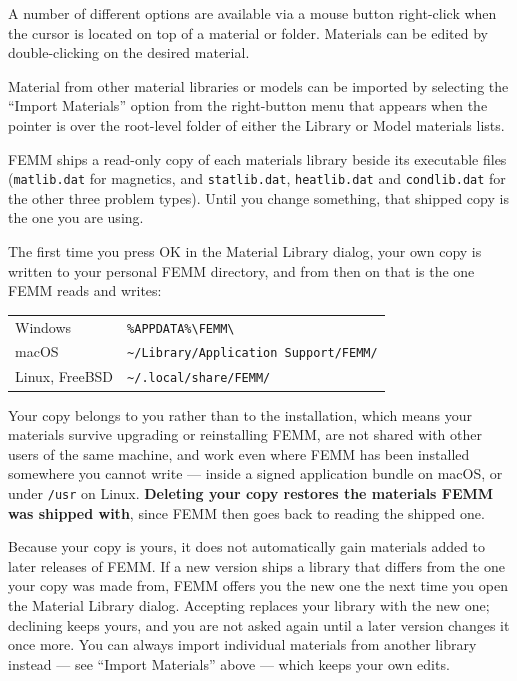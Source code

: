 \documentclass[12pt]{report}
\begin{document}
A number of different options are available via a mouse button right-click
when the cursor is located on top of a material or folder. Materials can be edited
by double-clicking on the desired material.

Material from other material libraries or models can be imported by selecting the
``Import Materials'' option from the right-button menu that appears when the pointer
is over the root-level folder of either the Library or Model materials lists.

FEMM ships a read-only copy of each materials library beside its
executable files (\verb+matlib.dat+ for magnetics, and
\verb+statlib.dat+, \verb+heatlib.dat+ and \verb+condlib.dat+ for the
other three problem types).  Until you change something, that shipped
copy is the one you are using.

The first time you press OK in the Material Library dialog, your own copy
is written to your personal FEMM directory, and from then on that is the
one FEMM reads and writes:

\begin{center}
\begin{tabular}{ll}
Windows          & \verb+%APPDATA%\FEMM\+ \\
macOS            & \verb+~/Library/Application Support/FEMM/+ \\
Linux, FreeBSD   & \verb+~/.local/share/FEMM/+ \\
\end{tabular}
\end{center}

Your copy belongs to you rather than to the installation, which means
your materials survive upgrading or reinstalling FEMM, are not shared
with other users of the same machine, and work even where FEMM has been
installed somewhere you cannot write --- inside a signed application
bundle on macOS, or under \verb+/usr+ on Linux.  {\bf Deleting your copy
restores the materials FEMM was shipped with}, since FEMM then goes back
to reading the shipped one.

Because your copy is yours, it does not automatically gain materials
added to later releases of FEMM.  If a new version ships a library that
differs from the one your copy was made from, FEMM offers you the new one
the next time you open the Material Library dialog.  Accepting replaces
your library with the new one; declining keeps yours, and you are not
asked again until a later version changes it once more.  You can always
import individual materials from another library instead --- see ``Import
Materials'' above --- which keeps your own edits.
\end{document}
